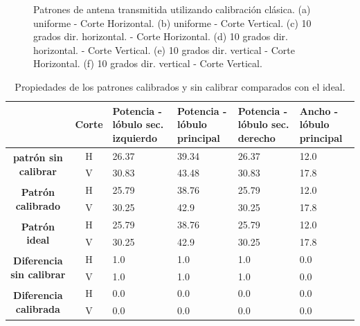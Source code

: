 \begin{figure}[H]
		\caption{Patrones de antena transmitida utilizando calibración clásica. (a) uniforme - Corte Horizontal. (b) uniforme - 
			Corte Vertical. (c) 10 grados dir. horizontal. - Corte Horizontal. (d) 10 grados dir. horizontal. - Corte Vertical. (e) 10 
			grados dir. vertical - Corte Horizontal. (f) 10 grados dir. vertical - Corte Vertical.}
	\label{fig:nonErrClassicalPat}
\end{figure}

\begin{table}[H]
	\footnotesize
	\centering
	\begin{tabular}{|c|c|p{2cm}|p{2cm}|p{2cm}|p{2cm}|}
		\cline{2-6}
		\multicolumn{1}{c|}{} & \textbf{Corte} & \textbf{Potencia - lóbulo sec. izquierdo} & \textbf{Potencia - lóbulo principal} &
		\textbf{Potencia - lóbulo sec. derecho} & \textbf{Ancho - lóbulo principal} \tabularnewline\hline
		\multirow{2}{*}{\textbf{patrón sin calibrar}} & H & 26.37 & 39.34 & 26.37 & 12.0 \tabularnewline\cline{2-6}
		& V & 30.83 & 43.48 & 30.83 & 17.8 \tabularnewline\hline
		\multirow{2}{*}{\textbf{Patrón calibrado}} & H & 25.79 & 38.76 & 25.79 & 12.0 \tabularnewline\cline{2-6}
		& V & 30.25 & 42.9 & 30.25 & 17.8 \tabularnewline\hline
		\multirow{2}{*}{\textbf{Patrón ideal}} & H & 25.79 & 38.76 & 25.79 & 12.0 \tabularnewline\cline{2-6}
		& V & 30.25 & 42.9 & 30.25 & 17.8 \tabularnewline\hline
		\multirow{2}{*}{\textbf{Diferencia sin calibrar}} & H & 1.0 & 1.0 & 1.0 & 0.0\tabularnewline\cline{2-6}
		& V & 1.0 & 1.0 & 1.0 & 0.0 \tabularnewline\hline
		\multirow{2}{*}{\textbf{Diferencia calibrada}} & H & 0.0 & 0.0 & 0.0 & 0.0 \tabularnewline\cline{2-6}
		& V & 0.0 & 0.0 & 0.0 & 0.0 \tabularnewline\hline
		\end{tabular}
		\caption{Propiedades de los patrones calibrados y sin calibrar comparados con el ideal.}
	\label{tab:nonErrMutual10degRow}
\end{table}


